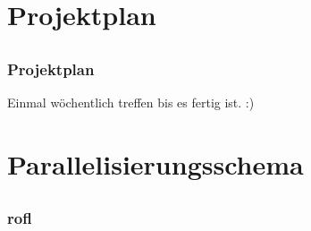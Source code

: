 \documentclass{beamer}
\begin{document}

\section{Projektplan}
\subsection{}


\begin{frame}
    \frametitle{Projektplan}
    Einmal wöchentlich treffen bis es fertig ist. :)
\end{frame}


\section{Parallelisierungsschema}
\subsection{}


\begin{frame}
    \frametitle{rofl}
\end{frame}

\end{document}
